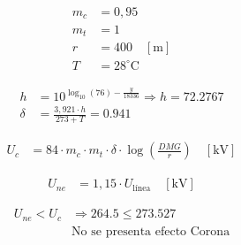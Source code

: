 \begin{align*}
m_c &= 0{,}95 \\
m_t &= 1 \\
r &= 400 \quad [\text{m}] \\
T &= 28^\circ \text{C}
\end{align*}

\begin{align*}
h &= 10^{\log_{10}(76) - \frac{y}{18336}} \Rightarrow h = 72.2767 \\
\delta &= \frac{3{,}921 \cdot h}{273 + T} =0.941
\end{align*}

\begin{align*}
U_c &= 84 \cdot m_c \cdot m_t \cdot \delta \cdot \log \left( \frac{DMG}{r} \right) \quad [\text{kV}]
\end{align*}

\begin{align*}
U_{ne} &= 1{,}15 \cdot U_{\text{línea}} \quad [\text{kV}]
\end{align*}

\begin{align*}
U_{ne} < U_c &\Rightarrow 264.5 \leq 273.527 \\
&\text{No se presenta efecto Corona}
\end{align*}
